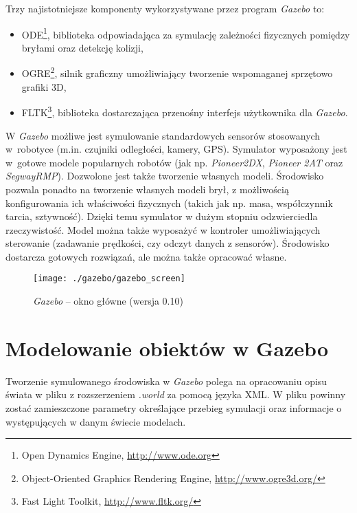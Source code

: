  	Trzy najistotniejsze komponenty wykorzystywane przez program \textit{Gazebo} to:
 	\begin{itemize}
 	 \item ODE\footnote{Open Dynamics Engine, \url{http://www.ode.org}}, biblioteka  odpowiadająca za symulację
 	 	zależności fizycznych pomiędzy bryłami oraz detekcję kolizji,
 	 \item OGRE\footnote{Object-Oriented Graphics Rendering Engine, \url{http://www.ogre3d.org/}}, 
		silnik graficzny umożliwiający tworzenie wspomaganej sprzętowo grafiki 3D,
 	 \item FLTK\footnote{Fast Light Toolkit, \url{http://www.fltk.org/}}, biblioteka dostarczająca 
		przenośny interfejs użytkownika dla \textit{Gazebo}.
 	\end{itemize}

	W \textit{Gazebo} możliwe jest symulowanie standardowych sensorów stosowanych w~robotyce (m.in. czujniki odległości, kamery, GPS). Symulator wyposażony jest w~gotowe modele 
	popularnych robotów (jak np. \textit{Pioneer2DX}, \textit{Pioneer 2AT} oraz \textit{SegwayRMP}).
	Dozwolone jest także tworzenie własnych modeli.
	Środowisko pozwala ponadto na tworzenie własnych modeli brył, z możliwością konfigurowania ich właściwości fizycznych (takich jak np. masa, współczynnik tarcia, sztywność).
	Dzięki temu symulator w dużym stopniu odzwierciedla rzeczywistość. Model można także wyposażyć w kontroler umożliwiających sterowanie (zadawanie prędkości, 
	czy odczyt danych z sensorów). Środowisko dostarcza gotowych rozwiązań, ale można także opracować własne.
	\begin{figure}[!t]
	\centering
	\label{fig:gazebo}
	\texttt{[image: ./gazebo/gazebo\_screen]}
	\caption{\textit{Gazebo} -- okno główne (wersja 0.10)}
	\end{figure}

	\section{Modelowanie obiektów w Gazebo}
	Tworzenie symulowanego środowiska w \textit{Gazebo} polega na opracowaniu opisu świata w pliku z rozszerzeniem \textit{.world} za pomocą języka XML. W pliku powinny zostać zamieszczone parametry
	określające przebieg symulacji oraz informacje o występujących w danym świecie modelach.
	
